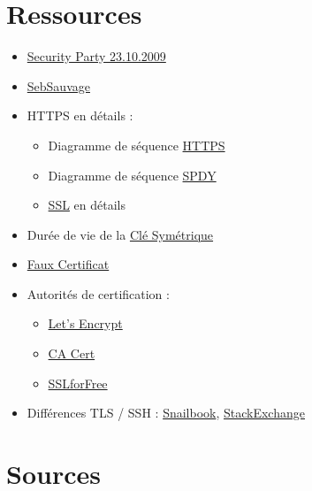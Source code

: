 \hypertarget{ressources}{%
\section{Ressources}\label{ressources}}

\begin{itemize}
\tightlist
\item
  \href{https://wiki.alphanet.ch/Ateliers/PresentationSecurityParty}{Security
  Party 23.10.2009}
\item
  \href{http://www.sebsauvage.net/comprendre/ssl/}{SebSauvage}
\item
  HTTPS en détails :

  \begin{itemize}
  \tightlist
  \item
    Diagramme de séquence
    \href{https://www.eventhelix.com/networking/SSL.pdf}{HTTPS}
  \item
    Diagramme de séquence
    \href{https://www.eventhelix.com/networking/ssl-tls/https-ssl-tls-session-for-spdy.pdf}{SPDY}
  \item
    \href{https://security.stackexchange.com/questions/20803/how-does-ssl-tls-work/20847\#20847}{SSL}
    en détails
  \end{itemize}
\item
  Durée de vie de la
  \href{https://security.stackexchange.com/questions/55454/how-long-does-an-https-symmetric-key-last}{Clé
  Symétrique}
\item
  \href{https://www.win.tue.nl/hashclash/rogue-ca/}{Faux Certificat}
\item
  Autorités de certification :

  \begin{itemize}
  \tightlist
  \item
    \href{https://letsencrypt.org/}{Let's Encrypt}
  \item
    \href{http://www.cacert.org/}{CA Cert}
  \item
    \href{https://www.sslforfree.com/}{SSLforFree}
  \end{itemize}
\item
  Différences TLS / SSH :
  \href{http://www.snailbook.com/faq/ssl.auto.html}{Snailbook},
  \href{http://security.stackexchange.com/questions/1599/what-is-the-difference-between-ssl-vs-ssh-which-is-more-secure}{StackExchange}
\end{itemize}

\hypertarget{sources}{%
\section{Sources}\label{sources}}
